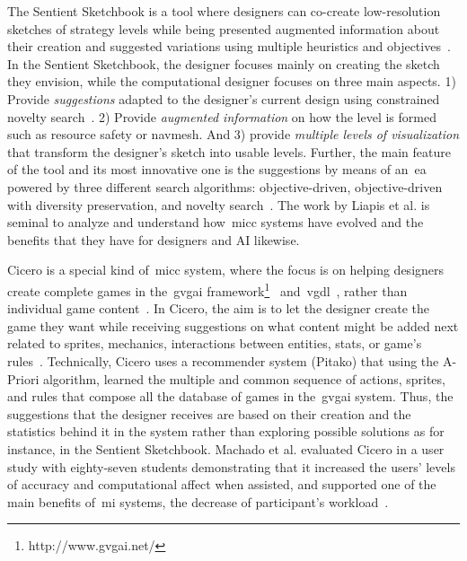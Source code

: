 The Sentient Sketchbook is a tool where designers can co-create low-resolution sketches of strategy levels while being presented augmented information about their creation and suggested variations using multiple heuristics and objectives~\cite{liapis_sentient_2013}. In the Sentient Sketchbook, the designer focuses mainly on creating the sketch they envision, while the computational designer focuses on three main aspects. 1) Provide \textit{suggestions} adapted to the designer's current design using constrained novelty search~\cite{liapis_constrained_2015}. 2) Provide \emph{augmented information} on how the level is formed such as resource safety or navmesh. And 3) provide \emph{multiple levels of visualization} that transform the designer's sketch into usable levels. Further, the main feature of the tool and its most innovative one is the suggestions by means of an~\acrshort{ea} powered by three different search algorithms: objective-driven, objective-driven with diversity preservation, and novelty search~\cite{preuss_searching_2014}. The work by Liapis et al. is seminal to analyze and understand how~\acrshort{micc} systems have evolved and the benefits that they have for designers and AI likewise.

Cicero is a special kind of~\acrshort{micc} system, where the focus is on helping designers create complete games in the~\acrfull{gvgai} framework\footnote{http://www.gvgai.net/}~\cite{perez-liebana_general_2019} and~\acrfull{vgdl}~\cite{schaul_video_2013}, rather than individual game content~\cite{machado_cicero_2017}. In Cicero, the aim is to let the designer create the game they want while receiving suggestions on what content might be added next related to sprites, mechanics, interactions between entities, stats, or game's rules~\cite{machado_pitako-recommending_2019}. Technically, Cicero uses a recommender system (Pitako) that using the A-Priori algorithm, learned the multiple and common sequence of actions, sprites, and rules that compose all the database of games in the~\acrshort{gvgai} system. Thus, the suggestions that the designer receives are based on their creation and the statistics behind it in the system rather than exploring possible solutions as for instance, in the Sentient Sketchbook. Machado et al. evaluated Cicero in a user study with eighty-seven students demonstrating that it increased the users' levels of accuracy and computational affect when assisted, and supported one of the main benefits of~\acrshort{mi} systems, the decrease of participant's workload~\cite{machado_evaluation_2019}.

